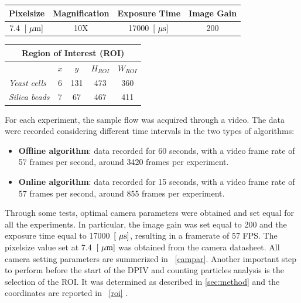 \documentclass[journal]{IEEEtran}
\theoremstyle{definition}
\theoremstyle{remark}
\begin{document}
\begin{table}[h!]
	\begin{tabular}{@{}llll@{}}
		\toprule
		\textbf{Pixelsize}         & \textbf{Magnification}  & \textbf{Exposure Time}       & \textbf{Image Gain}     \\ \midrule
		\multicolumn{1}{c}{7.4~$[\rm~\mu m]$} & \multicolumn{1}{c}{10X} & \multicolumn{1}{c}{17000~$[\rm~\mu s]$} & \multicolumn{1}{c}{200} \\ \bottomrule
	\end{tabular}
\end{table}

\begin{table}[h!]
	\begin{tabular}{@{}lcccc@{}}
		\toprule
		\multicolumn{5}{c}{\textbf{Region of Interest (ROI)}}                                                                                         \\ \midrule
		& \textbf{$x$} & \textbf{$y$} & \textbf{$H_{ROI}$} & \textbf{$W_{ROI}$} \\
		\textit{Yeast cells}  & 6          & 131        & 473                                          & 360                                          \\
		\textit{Silica beads} & 7          & 67         & 467                                          & 411                                          \\ \bottomrule
	\end{tabular}
\end{table}

For each experiment, the sample flow was acquired through a video. The data were recorded considering different time intervals in the two types of algorithms:
\begin{itemize}
	\item \textbf{Offline algorithm}: data recorded for 60 seconds, with a video frame rate of 57 frames per second, around 3420 frames per experiment.
	\item \textbf{Online algorithm}: data recorded for 15 seconds, with a video frame rate of 57 frames per second, around 855 frames per experiment. 
\end{itemize}


Through some tests, optimal camera parameters were obtained and set equal for all the experiments. In particular, the image gain was set equal to 200 and the exposure time equal to 17000~$[\rm~\mu s]$, resulting in a framerate of 57 FPS. The pixelsize value set at 7.4~$[\rm~\mu m]$ was obtained from the camera datasheet. All camera setting parameters are summerized in ~\tab\ref{campar}.
Another important step to perform before the start of the DPIV and
counting particles analysis is the selection of the ROI.
It was determined as described in \sect\ref{sec:method} and the coordinates are reported in ~\tab\ref{roi} . 
\end{document}
